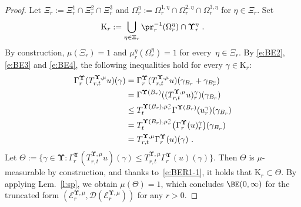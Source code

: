 \documentclass[11pt,letterpaper]{amsart}
\newcommand{\Kappa}{\mathrm{K}}
\newcommand{\fstop}{\,\,\mathrm{.}}
\newcommand{\QP}{{\mu}}
\newcommand{\dUpsilon}{{\mathbf \Upsilon}}
\newcommand{\U}{\dUpsilon}
\newcommand{\E}{\mathcal E}
\renewcommand{\1}{\mathbf 1}
\numberwithin{equation}{section}
\theoremstyle{plain}
\theoremstyle{definition}
\theoremstyle{remark}
\begin{document}
\begin{proof}
Let  $\Xi_r:=\Xi_{r}^{1} \cap \Xi_{r}^{2}  \cap\Xi_{r}^{3}$ and $\Omega^\eta_r:=\Omega_{r}^{1, \eta} \cap \Omega_{r}^{2, \eta} \cap \Omega_{r}^{3, \eta}$ for $\eta \in \Xi_r$.
Set 
$$\Kappa_r:=\bigcup_{\eta \in \Xi_r} \pr_{r}^{-1}(\Omega_{r}^{\eta})\cap \U_{r}^{\eta} \fstop$$
By construction, $\QP(\Xi_r)=1$ and $\QP_r^\eta(\Omega^\eta_r)=1$ for every~$\eta \in \Xi_r$. By \eqref{e:BE2}, \eqref{e:BE3} and \eqref{e:BE4}, the following inequalities hold for every $\gamma \in \Kappa_r$:
\begin{align} \label{e:BER1-1}
\Gamma^\U_r(T_{r, t}^{\U, \QP} u)(\gamma) 
&= \Gamma^\U_r(T_{r, t}^{\U, \QP} u)(\gamma_{B_r}+\gamma_{B_r^c}) 
\\
&= \Gamma^{\U(B_r)}((T^{\U, \QP}_{r, t} u)_{r}^{\gamma})(\gamma_{B_r})  \notag
\\
&\le T_{t}^{\U(B_r), \QP_r^\gamma}\Gamma^{\U(B_r)}(u_{r}^{\gamma})(\gamma_{B_r})  \notag
\\
&= T_{t}^{\U(B_r), \QP_r^\gamma}\bigl(\Gamma^\U_r(u)_{r}^{\gamma}\bigr)(\gamma_{B_r})  \notag
\\
&= T_{r, t}^{\U, \QP} \Gamma^\U_r(u)(\gamma) \fstop \notag
\end{align}
Let $\Theta:=\{\gamma \in \U: \Gamma^\U_r(T_{r, t}^{\U, \QP} u)(\gamma) \le T_{r, t}^{\U, \QP} \Gamma^\U_r(u)(\gamma)\}$.  Then $\Theta$ is $\QP$-measurable by construction, and thanks to~\eqref{e:BER1-1}, it holds that $\Kappa_r  \subset \Theta$. By applying Lem.~\ref{l:sp}, we obtain $\QP(\Theta)=1$, which concludes $\BE(0,\infty)$ for the truncated form $(\E^{\U, \QP}_{r}, \mathcal D(\E^{\U, \QP}_r))$ for any $r>0$.


\end{proof}
\end{document}

